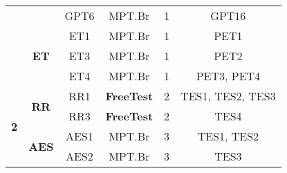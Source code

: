 \begin{table}[!ht]
{\begin{tabular}{|c|c|c|c|c|c|}
                                                                                &                               & GPT6        & MPT.Br            & 1                                                                                  & GPT16                                                                     \\ \cline{2-6} 
                                                                                & \multirow{3}{*}{\textbf{ET}}  & ET1         & MPT.Br            & 1                                                                                  & PET1                                                                      \\ \cline{3-6} 
                                                                                &                               & ET3         & MPT.Br            & 1                                                                                  & PET2                                                                      \\ \cline{3-6} 
                                                                                &                               & ET4         & MPT.Br            & 1                                                                                  & PET3, PET4                                                                \\ \hline
\multirow{5}{*}{\textbf{2}}                                                     & \multirow{2}{*}{\textbf{RR}}  & RR1         & \textbf{FreeTest} & 2                                                                                  & TES1, TES2, TES3                                                          \\ \cline{3-6} 
                                                                                &                               & RR3         & \textbf{FreeTest} & 2                                                                                  & TES4                                                                      \\ \cline{2-6} 
                                                                                & \multirow{3}{*}{\textbf{AES}} & AES1        & MPT.Br            & 3                                                                                  & TES1, TES2                                                                \\ \cline{3-6} 
                                                                                &                               & AES2        & MPT.Br            & 3                                                                                  & TES3                                                                      \\ \cline{3-6} 

\end{tabular}}
\end{table}
